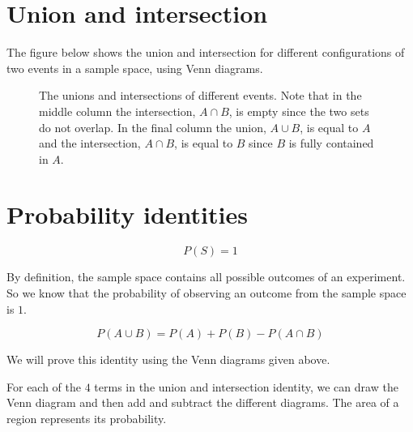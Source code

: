\section{Union and intersection}

The figure below shows the union and intersection for different
configurations of two events in a sample space, using Venn diagrams.

\begin{figure}[H]
  
  \begin{caption*}{The unions and intersections of different events. Note that
    in the middle column the intersection, $A \cap B$, is empty since
    the two sets do not overlap. In the final column the union,
    $A \cup B$, is equal to $A$ and the intersection, $A \cap B$, is
    equal to $B$ since $B$ is fully contained in $A$.}\end{caption*}
  \label{fig:venn_union_intersection}
\end{figure}

\section{Probability identities}
\begin{equation*}
 P(S)=1
\end{equation*}


By definition, the sample space contains all possible outcomes of an
experiment. So we know that the probability of observing an outcome
from the sample space is $1$.

\begin{equation*}
 P(A \cup B) = P(A) + P(B) - P(A \cap B)
\end{equation*}


We will prove this identity using the Venn diagrams given above.

For each of the $4$ terms in the
union and intersection identity, we can draw the Venn diagram and then
add and subtract the different diagrams. The area of a region
represents its probability.

